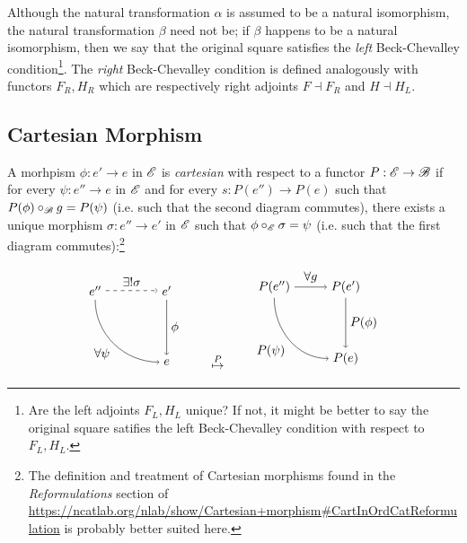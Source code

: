 \documentclass[10pt]{article}
\theoremstyle{definition}
\theoremstyle{remark}
\begin{document}
Although the natural transformation $\alpha$ is assumed to be a natural isomorphism, the natural transformation $\beta$ need not be; if $\beta$ happens to be a natural isomorphism, then we say that the original square satisfies the \textit{left} Beck-Chevalley condition\footnote{Are the left adjoints $F_L, H_L$ unique? If not, it might be better to say the original square satifies the left Beck-Chevalley condition with respect to $F_L, H_L$.}. The \textit{right} Beck-Chevalley condition is defined analogously with functors $F_R, H_R$ which are respectively right adjoints $F \dashv F_R$ and $H \dashv H_L$.

\subsection{Cartesian Morphism}

A morhpism $\phi : e' \to e$ in $\mathscr{E}$ is \textit{cartesian} with respect to a functor $P : \mathscr{E} \to \mathscr{B}$ if for every $\psi : e'' \to e$ in $\mathscr{E}$ and for every $s : P(e'') \to P(e)$ such that $ P(\phi) \circ_{\mathscr{B}} g = P(\psi)$ (i.e. such that the second diagram commutes), there exists a unique morphism $\sigma : e'' \to e'$ in $\mathscr{E}$ such that $\phi \circ_{\mathscr{E}} \sigma = \psi$ (i.e. such that the first diagram commutes):\footnote{The definition and treatment of Cartesian morphisms found in the \textit{Reformulations} section of \url{https://ncatlab.org/nlab/show/Cartesian+morphism\#CartInOrdCatReformulation} is probably better suited here.}

\[
    \begin{tikzpicture}
        \draw (-1,+1) node(tl){$e''$};
        \draw (+1,+1) node(tr){$e'$};
        \draw (+1,-1) node(br){$e$};

        \draw[dashed, ->] (tl) to node[above]{$\exists!\sigma$} (tr);
        \draw[->] (tl) to[out=-90, in=180] node[below left]{$\forall\psi$} (br);
        \draw[->] (tr) to node[right]{$\phi$} (br);
    \end{tikzpicture}
    \qquad
    \stackrel{P}{\mapsto}
    \qquad
    \begin{tikzpicture}
        \draw (-1,+1) node(tl){$P(e'')$};
        \draw (+1,+1) node(tr){$P(e')$};
        \draw (+1,-1) node(br){$P(e)$};

        \draw[->] (tl) to node[above]{$\forall g$} (tr);
        \draw[->] (tl) to[out=-90, in=180] node[below left]{$P(\psi)$} (br);
        \draw[->] (tr) to node[right]{$P(\phi)$} (br);
    \end{tikzpicture}
\]
\end{document}
